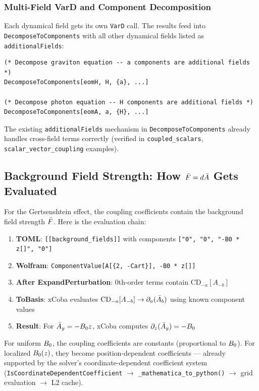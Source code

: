 \subsubsection{Multi-Field VarD and Component Decomposition}
\label{sec:mfp-wls-decompose}

Each dynamical field gets its own \texttt{VarD} call. The results feed into \texttt{DecomposeToComponents} with all other dynamical fields listed as \texttt{additionalFields}:

\begin{lstlisting}[style=mathematica]
(* Decompose graviton equation -- a components are additional fields *)
DecomposeToComponents[eomH, H, {a}, ...]

(* Decompose photon equation -- H components are additional fields *)
DecomposeToComponents[eomA, a, {H}, ...]
\end{lstlisting}

The existing \texttt{additionalFields} mechanism in \texttt{DecomposeToComponents} already handles cross-field terms correctly (verified in \texttt{coupled\_scalars}, \texttt{scalar\_vector\_coupling} examples).

\subsection{Background Field Strength: How $\bar{F} = d\bar{A}$ Gets Evaluated}
\label{sec:mfp-background}

For the Gertsenshtein effect, the coupling coefficients contain the background field strength $\bar{F}$. Here is the evaluation chain:

\begin{enumerate}
  \item \textbf{TOML}: \texttt{[[background\_fields]]} with components \texttt{["0", "0", "-B0 * z[]", "0"]}
  \item \textbf{Wolfram}: \texttt{ComponentValue[A[\{2, -Cart\}], -B0 * z[]]}
  \item \textbf{After ExpandPerturbation}: 0th-order terms contain $\mathrm{CD}_{-a}[A_{-b}]$
  \item \textbf{ToBasis}: xCoba evaluates $\mathrm{CD}_{-a}[A_{-b}] \to \partial_a(\bar{A}_b)$ using known component values
  \item \textbf{Result}: For $\bar{A}_y = -B_0 z$, xCoba computes $\partial_z(\bar{A}_y) = -B_0$
\end{enumerate}

For uniform $B_0$, the coupling coefficients are constants (proportional to $B_0$). For localized $B_0(z)$, they become position-dependent coefficients --- already supported by the solver's coordinate-dependent coefficient system (\texttt{IsCoordinateDependentCoefficient} $\to$ \texttt{\_mathematica\_to\_python()} $\to$ grid evaluation $\to$ L2 cache).

